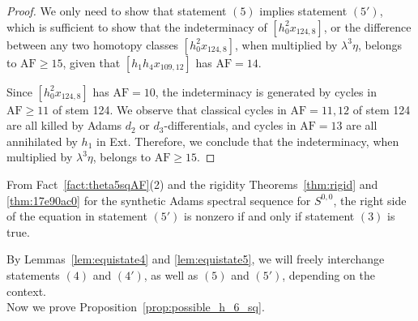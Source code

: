 \documentclass{amsart}
\numberwithin{equation}{section}
\newcommand{\AF}{\mathrm{AF}}
\begin{document}
\begin{proof}
    We only need to show that statement $(5)$ implies statement $(5')$, which is sufficient to show that the indeterminacy of $[h_0^2x_{124,8}]$, or the difference between any two homotopy classes $[h_0^2x_{124,8}]$, when multiplied by $\lambda^3 \eta$, belongs to $\AF \ge 15$, given that $[h_1h_4x_{109,12}]$ has $\AF=14$.

    Since $[h_0^2x_{124,8}]$ has $\AF=10$, the indeterminacy is generated by cycles in $\AF \ge 11$ of stem 124. We observe that classical cycles in $\AF=11, 12$ of stem 124 are all killed by Adams $d_2$ or $d_3$-differentials, and cycles in $\AF=13$ are all annihilated by $h_1$ in Ext. Therefore, we conclude that the indeterminacy, when multiplied by $\lambda^3 \eta$, belongs to $\AF \ge 15$.
\end{proof}

\begin{remark}
    From Fact~\ref{fact:theta5sqAF}(2) and the rigidity Theorems~\ref{thm:rigid} and \ref{thm:17e90ac0} for the synthetic Adams spectral sequence for $S^{0,0}$, the right side of the equation in statement $(5')$ is nonzero if and only if statement $(3)$ is true.
\end{remark}


%
%

%
%

%

%

%

%

%

%
%
%
%
%
%
%

%
%

%


By Lemmas~\ref{lem:equistate4} and \ref{lem:equistate5}, we will freely interchange statements $(4)$ and $(4')$, as well as $(5)$ and $(5')$, depending on the context.\\

Now we prove Proposition~\ref{prop:possible_h_6_sq}.
\end{document}
